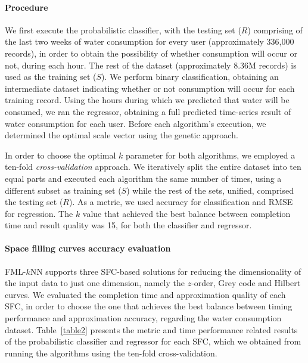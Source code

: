 \paragraph{Procedure}
\label{par:procedure1}
We first execute the probabilistic classifier, with the testing set ($R$) comprising of the last two weeks of water consumption for every user (approximately 336,000 records), in order to obtain the possibility of whether consumption will occur or not, during each hour. The rest of the dataset (approximately 8.36M records) is used as the training set ($S$). We perform binary classification, obtaining an intermediate dataset indicating whether or not consumption will occur for each training record. Using the hours during which we predicted that water will be consumed, we ran the regressor, obtaining a full predicted time-series result of water consumption for each user. Before each algorithm's execution, we determined the optimal scale vector using the genetic approach.

In order to choose the optimal $k$ parameter for both algorithms, we employed a ten-fold \textit{cross-validation} approach. We iteratively split the entire dataset into ten equal parts and executed each algorithm the same number of times, using a different subset as training set ($S$) while the rest of the sets, unified, comprised the testing set ($R$). As a metric, we used accuracy for classification and RMSE for regression. The $k$ value that achieved the best balance between completion time and result quality was 15, for both the classifier and regressor.

\paragraph{Space filling curves accuracy evaluation}
\label{par:sfc_eval}
FML-$k$NN supports three SFC-based solutions for reducing the dimensionality of the input data to just one dimension, namely the $z$-order, Grey code and Hilbert curves. We evaluated the completion time and approximation quality of each SFC, in order to choose the one that achieves the best balance between timing performance and approximation accuracy, regarding the water consumption dataset. Table~\ref{table2} presents the metric and time performance related results of the probabilistic classifier and regressor for each SFC, which we obtained from running the algorithms using the ten-fold cross-validation.

